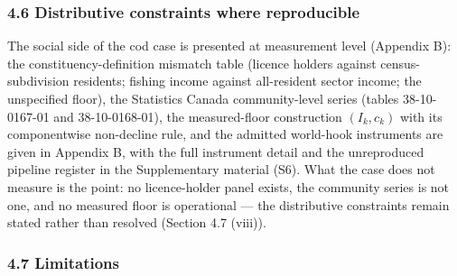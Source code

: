 \documentclass[11pt]{article}
\begin{document}
\subsubsection{4.6 Distributive constraints where
reproducible}\label{distributive-constraints-where-reproducible}

The social side of the cod case is presented at measurement level (Appendix B): the constituency-definition
mismatch table (licence holders against census-subdivision residents;
fishing income against all-resident sector income; the unspecified
floor), the Statistics Canada community-level series (tables
38-10-0167-01 and 38-10-0168-01), the measured-floor construction
\((I_k, c_k)\) with its componentwise non-decline rule, and the admitted
world-hook instruments are given in Appendix B, with the full
instrument detail and the unreproduced pipeline register in the
Supplementary material (S6). What the case does not measure is the
point: no licence-holder panel exists, the community series is not
one, and no measured floor is operational --- the distributive
constraints remain stated rather than resolved (Section 4.7 (viii)).

\subsubsection{4.7 Limitations}\label{limitations}
\end{document}
